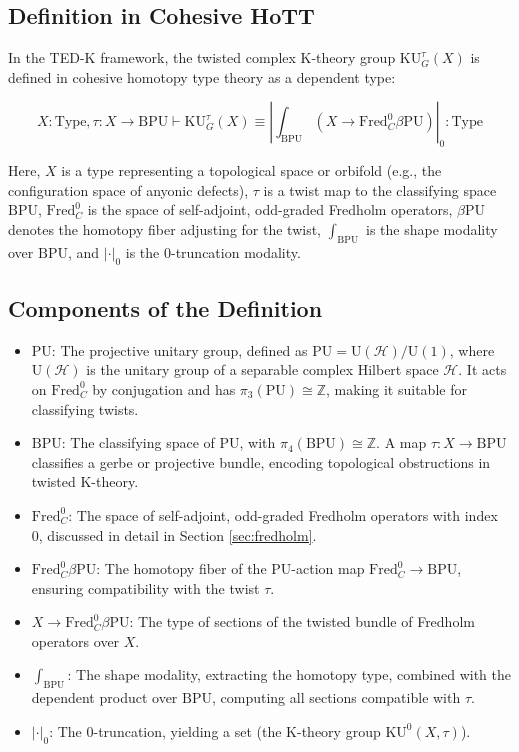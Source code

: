 \documentclass{article}
\theoremstyle{definition}
\begin{document}
\subsection{Definition in Cohesive HoTT}

In the TED-K framework, the twisted complex K-theory group \(\mathrm{KU}^\tau_G(X)\) is defined in cohesive homotopy type theory as a dependent type:

\begin{equation}
X: \text{Type}, \tau: X \to \mathrm{BPU} \vdash \mathrm{KU}^\tau_G(X) \equiv \left| \int_{\mathrm{BPU}} \left( X \to \text{Fred}_C^0 \beta \mathrm{PU} \right) \right|_0 : \text{Type}
\end{equation}

Here, \(X\) is a type representing a topological space or orbifold (e.g., the configuration space of anyonic defects), \(\tau\) is a twist map to the classifying space \(\mathrm{BPU}\), \(\text{Fred}_C^0\) is the space of self-adjoint, odd-graded Fredholm operators, \(\beta \mathrm{PU}\) denotes the homotopy fiber adjusting for the twist, \(\int_{\mathrm{BPU}}\) is the shape modality over \(\mathrm{BPU}\), and \(|\cdot|_0\) is the 0-truncation modality.

\subsection{Components of the Definition}

\begin{itemize}
    \item \textbf{\(\mathrm{PU}\)}: The projective unitary group, defined as \(\mathrm{PU} = \mathrm{U}(\mathscr{H}) / \mathrm{U}(1)\), where \(\mathrm{U}(\mathscr{H})\) is the unitary group of a separable complex Hilbert space \(\mathscr{H}\). It acts on \(\text{Fred}_C^0\) by conjugation and has \(\pi_3(\mathrm{PU}) \cong \mathbb{Z}\), making it suitable for classifying twists.
    \item \textbf{\(\mathrm{BPU}\)}: The classifying space of \(\mathrm{PU}\), with \(\pi_4(\mathrm{BPU}) \cong \mathbb{Z}\). A map \(\tau: X \to \mathrm{BPU}\) classifies a gerbe or projective bundle, encoding topological obstructions in twisted K-theory.
    \item \textbf{\(\text{Fred}_C^0\)}: The space of self-adjoint, odd-graded Fredholm operators with index 0, discussed in detail in Section \ref{sec:fredholm}.
    \item \textbf{\(\text{Fred}_C^0 \beta \mathrm{PU}\)}: The homotopy fiber of the \(\mathrm{PU}\)-action map \(\text{Fred}_C^0 \to \mathrm{BPU}\), ensuring compatibility with the twist \(\tau\).
    \item \textbf{\(X \to \text{Fred}_C^0 \beta \mathrm{PU}\)}: The type of sections of the twisted bundle of Fredholm operators over \(X\).
    \item \textbf{\(\int_{\mathrm{BPU}}\)}: The shape modality, extracting the homotopy type, combined with the dependent product over \(\mathrm{BPU}\), computing all sections compatible with \(\tau\).
    \item \textbf{\(|\cdot|_0\)}: The 0-truncation, yielding a set (the K-theory group \(\mathrm{KU}^0(X, \tau)\)).
\end{itemize}
\end{document}
